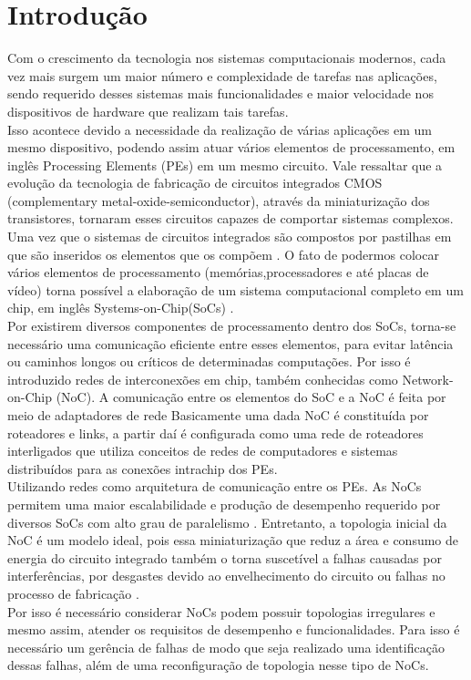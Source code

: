 \documentclass[conference]{IEEEtran}
\begin{document}
	\section{Introdução}
	Com o crescimento da tecnologia nos sistemas computacionais modernos, cada vez mais surgem um maior número e complexidade de tarefas nas aplicações, sendo requerido desses sistemas  mais funcionalidades e maior velocidade nos dispositivos de hardware que realizam tais tarefas.\\ Isso acontece devido a necessidade da realização de várias aplicações em um mesmo dispositivo, podendo assim atuar vários elementos de processamento, em inglês Processing Elements (PEs) em um mesmo circuito. Vale ressaltar que a evolução da tecnologia de fabricação de circuitos integrados CMOS (complementary metal-oxide-semiconductor), através da miniaturização dos transistores, tornaram esses circuitos capazes de comportar sistemas complexos.\\
	Uma vez que o sistemas de circuitos integrados são compostos por pastilhas em que são inseridos os elementos que os compõem \cite{b2}. O fato de podermos colocar vários elementos de processamento (memórias,processadores e até placas de vídeo) torna possível a elaboração de um sistema computacional completo em um chip, em inglês Systems-on-Chip(SoCs) \cite{b1}.\\
	Por existirem diversos componentes de processamento dentro dos SoCs, torna-se necessário uma comunicação eficiente entre esses elementos, para evitar latência ou caminhos longos ou críticos de determinadas computações. Por isso é introduzido  redes de interconexões em chip, também conhecidas como Network-on-Chip (NoC). A comunicação entre os elementos do SoC e a NoC é
	feita por meio de adaptadores de rede Basicamente   uma dada NoC é constituída por roteadores e links, a partir daí é configurada como uma rede de roteadores interligados que utiliza conceitos de redes de computadores e sistemas distribuídos para as conexões intrachip dos PEs. \\
	Utilizando redes como arquitetura de comunicação entre os PEs. As NoCs permitem uma maior escalabilidade e produção de  desempenho requerido por diversos SoCs com alto grau de paralelismo \cite{b3}. Entretanto, a topologia inicial da NoC é um modelo ideal, pois essa miniaturização que reduz a área e consumo de energia do circuito integrado também o torna suscetível a falhas causadas por interferências, por desgastes devido ao envelhecimento do circuito ou falhas no processo de fabricação \cite{b4}.\\ Por isso é necessário considerar NoCs podem possuir topologias irregulares e mesmo assim, atender os requisitos de desempenho e funcionalidades. Para isso é necessário um gerência de falhas de modo que seja realizado uma identificação dessas falhas, além de uma reconfiguração de topologia nesse tipo de NoCs. \\
\end{document}
